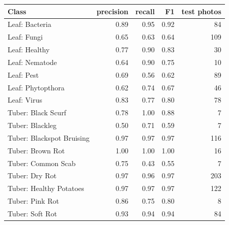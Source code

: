 \begin{tabular}{lrrrr}
\toprule
Class & precision & recall & F1 & test photos \\
\midrule
Leaf: Bacteria & 0.89 & 0.95 & 0.92 & 84 \\
Leaf: Fungi & 0.65 & 0.63 & 0.64 & 109 \\
Leaf: Healthy & 0.77 & 0.90 & 0.83 & 30 \\
Leaf: Nematode & 0.64 & 0.90 & 0.75 & 10 \\
Leaf: Pest & 0.69 & 0.56 & 0.62 & 89 \\
Leaf: Phytopthora & 0.62 & 0.74 & 0.67 & 46 \\
Leaf: Virus & 0.83 & 0.77 & 0.80 & 78 \\
Tuber: Black Scurf & 0.78 & 1.00 & 0.88 & 7 \\
Tuber: Blackleg & 0.50 & 0.71 & 0.59 & 7 \\
Tuber: Blackspot Bruising & 0.97 & 0.97 & 0.97 & 116 \\
Tuber: Brown Rot & 1.00 & 1.00 & 1.00 & 16 \\
Tuber: Common Scab & 0.75 & 0.43 & 0.55 & 7 \\
Tuber: Dry Rot & 0.97 & 0.96 & 0.97 & 203 \\
Tuber: Healthy Potatoes & 0.97 & 0.97 & 0.97 & 122 \\
Tuber: Pink Rot & 0.86 & 0.75 & 0.80 & 8 \\
Tuber: Soft Rot & 0.93 & 0.94 & 0.94 & 84 \\
\bottomrule
\end{tabular}